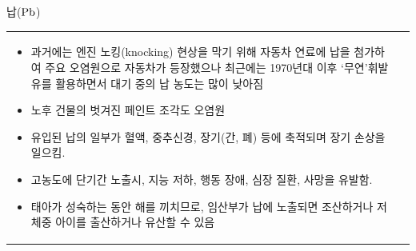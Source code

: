 \begin{frame}[t]{납($\rm{{Pb}}$)	}
	\begin{tabular}{ll}
		\begin{minipage}[t]{0.475\textwidth}\scriptsize
			\begin{itemize}
				\item 과거에는 엔진 노킹(knocking) 현상을 막기 위해 자동차 연료에 납을 첨가하여 주요 오염원으로 자동차가 등장했으나 최근에는 1970년대 이후 ‘무연’휘발유를 활용하면서 대기 중의 납 농도는 많이 낮아짐
				\item 노후 건물의 벗겨진 페인트 조각도 오염원
				\item 유입된 납의 일부가 혈액, 중추신경, 장기(간, 폐) 등에 축적되며 장기 손상을 일으킴.
				\item 고농도에 단기간 노출시, 지능 저하, 행동 장애, 심장 질환, 사망을 유발함. 
				\item 태아가 성숙하는 동안 해를 끼치므로, 임산부가 납에 노출되면 조산하거나 저체중 아이를  출산하거나 유산할 수 있음
			\end{itemize}
		\end{minipage}	
		&
		\begin{minipage}[t]{0.475\textwidth} \scriptsize	
			
		\end{minipage}
	\end{tabular}
\end{frame}


